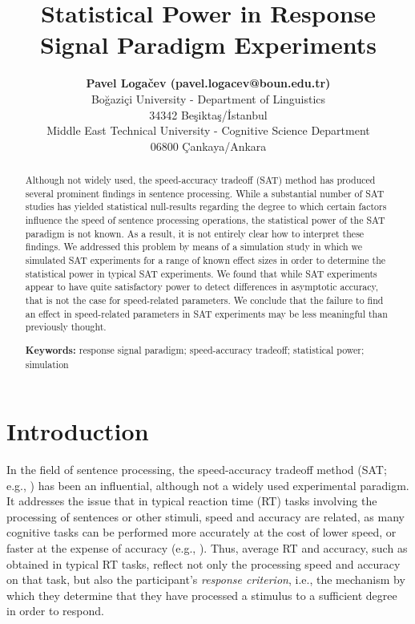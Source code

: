 \documentclass[10pt,letterpaper]{article}
\title{Statistical Power in Response Signal Paradigm Experiments}
\author{{\large \bf Pavel Logačev (pavel.logacev@boun.edu.tr)} \\
  Boğaziçi University - Department of Linguistics \\
  34342 Beşiktaş/İstanbul
  \AND {\large \bf M. İlteriş Bozkurt (ilteris.bozkurt@metu.edu.tr)} \\
  Middle East Technical University - Cognitive Science Department \\
  06800 Çankaya/Ankara}
\begin{document}
\maketitle

\begin{abstract}
Although not widely used, the speed-accuracy tradeoff (SAT) method has produced several prominent findings in sentence processing. While a substantial number of SAT studies has yielded statistical null-results regarding the degree to which certain factors influence the speed of sentence processing operations, the statistical power of the SAT paradigm is not known. As a result, it is not entirely clear how to interpret these findings.
We addressed this problem by means of a simulation study in which we simulated SAT experiments for a range of known effect sizes in order to determine the statistical power in typical SAT experiments.
We found that while SAT experiments appear to have quite satisfactory power to detect differences in asymptotic accuracy, that is not the case for speed-related parameters. We conclude that the failure to find an effect in speed-related parameters in SAT experiments may be less meaningful than previously thought.

\textbf{Keywords:} 
response signal paradigm; speed-accuracy tradeoff; statistical power; simulation
\end{abstract}

\section{Introduction}\label{introduction}

In the field of sentence processing, the speed-accuracy tradeoff method (SAT; e.g., ) has been an influential, although not a widely used experimental paradigm.
It addresses the issue that in typical reaction time (RT) tasks involving the processing of sentences or other stimuli, speed and accuracy are related, as many cognitive tasks can be performed more accurately at the cost of lower speed, or faster at the expense of accuracy (e.g., ). Thus, average RT and accuracy, such as obtained in typical RT tasks, reflect not only the processing speed and accuracy on that task, but also the participant's \textit{response criterion}, i.e., the mechanism by which they determine that they have processed a stimulus to a sufficient degree in order to respond.
\end{document}
